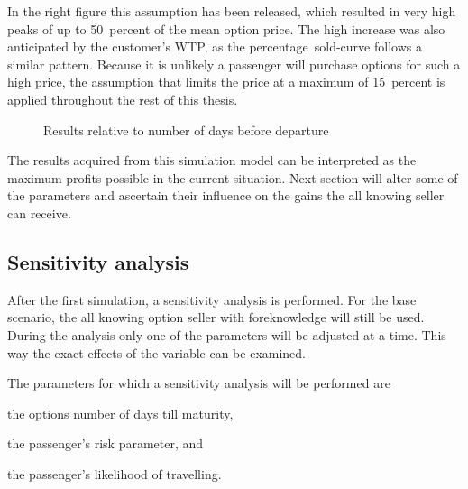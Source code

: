 In the right figure this assumption has been released, which resulted in very high peaks of up to 50~percent of the mean option price. The high increase was also anticipated by the customer's WTP, as the percentage~sold-curve follows a similar pattern. Because it is unlikely a passenger will purchase options for such a high price, the assumption that limits the price at a maximum of 15~percent is applied throughout the rest of this thesis.


\begin{figure}
\centering
{}
\qquad
{}
\caption{Results relative to number of days before departure}
\label{fig:OptionPricesDBB}
\end{figure}


The results acquired from this simulation model can be interpreted as the maximum profits possible in the current situation. Next section will alter some of the parameters and ascertain their influence on the gains the all knowing seller can receive.


\subsection{Sensitivity analysis}
After the first simulation, a sensitivity analysis is performed. For the base scenario, the all knowing option seller with foreknowledge will still be used. During the analysis only one of the parameters will be adjusted at a time. This way the exact effects of the variable can be examined.

The parameters for which a sensitivity analysis will be performed are \begin{inparaenum}
    \item the options number of days till maturity,
    \item the passenger's risk parameter, and
    \item the passenger's likelihood of travelling.
\end{inparaenum}

